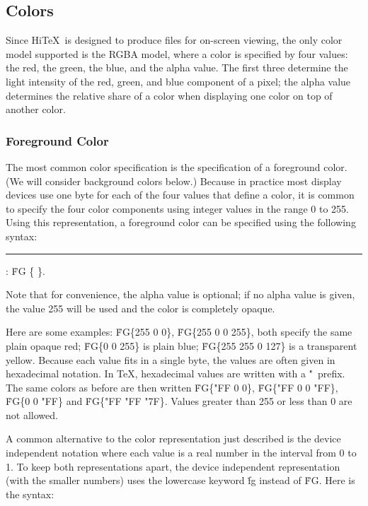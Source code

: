 \subsection{Colors}
Since Hi\TeX\ is designed to produce files for on-screen viewing,
the only color model supported is the RGBA model, where a color is
specified by four values: the red, the green, the blue, and the alpha
value. The first three determine the light intensity of the red,
green, and blue component of a pixel; the alpha value determines
the relative share of a color when displaying
one color on top of another color. 

\subsubsection{Foreground Color}
The most common color specification is the specification of a
foreground color. (We will consider background colors below.)
Because in practice most display devices use one byte for
each of the four values that define a color,
it is common to specify the four color
components using integer values in the range 0 to 255.
Using this representation, a foreground color can be specified using
the following syntax:

\medskip
\rule{}:
   \.{FG} \.{\{}     \.{\}}.
\medskip

Note that for convenience, the alpha value
is optional; if no alpha value is given, the value 255 will be used
and the color is completely opaque.

Here are some examples:
\.{FG\{255 0 0\}}, \.{FG\{255 0 0 255\}},
both specify the same plain opaque red;
\.{FG\{0 0 255\}} is plain blue;
\.{FG\{255 255 0 127\}} is  a transparent yellow.
Because each value fits in a single byte, the values are often given in
hexadecimal notation. In \TeX, hexadecimal values are written with
a \.{"}~prefix. The same colors as before are then written
\.{FG\{"FF 0 0\}}, \.{FG\{"FF 0 0 "FF\}},
\.{FG\{0 0 "FF\}} and \.{FG\{"FF "FF "7F\}}. 
Values greater than 255 or less than 0 are not allowed.

A common alternative to the color representation just described
is the device independent notation where each
value is a real number in the interval from 0 to 1.
To keep both representations apart, the device independent
representation (with the smaller numbers) uses the lowercase
keyword \.{fg} instead of \.{FG}. Here is the syntax:


